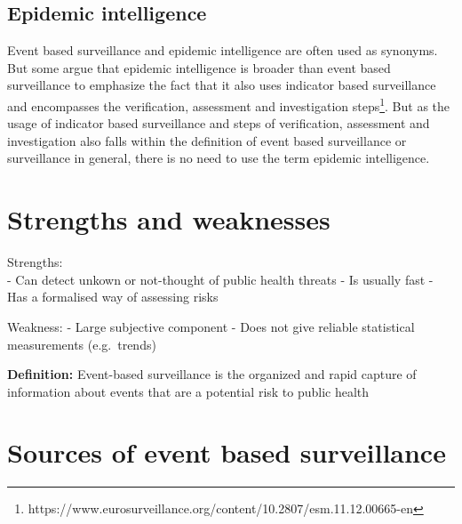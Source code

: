 \documentclass[
  letterpaper,
  DIV=11,
  numbers=noendperiod]{scrreprt}
\begin{document}
\subsection{Epidemic intelligence}\label{epidemic-intelligence}

Event based surveillance and epidemic intelligence are often used as
synonyms. But some argue that epidemic intelligence is broader than
event based surveillance to emphasize the fact that it also uses
indicator based surveillance and encompasses the verification,
assessment and investigation steps\footnote{https://www.eurosurveillance.org/content/10.2807/esm.11.12.00665-en}.
But as the usage of indicator based surveillance and steps of
verification, assessment and investigation also falls within the
definition of event based surveillance or surveillance in general, there
is no need to use the term epidemic intelligence.

\section{Strengths and weaknesses}\label{strengths-and-weaknesses-1}

Strengths:\\
- Can detect unkown or not-thought of public health threats - Is usually
fast - Has a formalised way of assessing risks

Weakness: - Large subjective component - Does not give reliable
statistical measurements (e.g.~trends)

\begin{tcolorbox}[enhanced jigsaw, leftrule=.75mm, colback=white, breakable, arc=.35mm, rightrule=.15mm, bottomrule=.15mm, colframe=quarto-callout-color-frame, opacityback=0, toprule=.15mm, left=2mm]

\textbf{Definition:} Event-based surveillance is the organized and rapid
capture of information about events that are a potential risk to public
health\footnotemark{}

\end{tcolorbox}


\section{Sources of event based
surveillance}\label{sources-of-event-based-surveillance}
\end{document}
